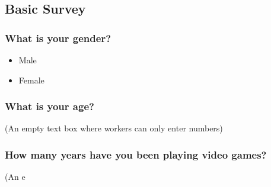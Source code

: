 \subsection{Basic Survey}\subsubsection{What is your gender?}\begin{itemize} \item Male \item Female \end{itemize}\subsubsection{What is your age?} (An empty text box where workers can only enter numbers) \subsubsection{How many years have you been playing video games?} (An e